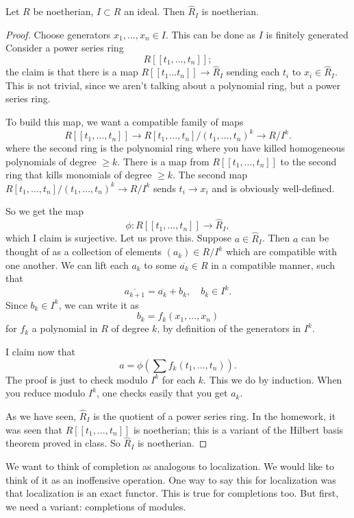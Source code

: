 \begin{proposition} 
Let $R$ be noetherian, $I \subset R$ an ideal. Then $\hat{R}_I$ is noetherian.
\end{proposition} 
\begin{proof} 
Choose generators $x_1, \dots, x_n \in I$. This can be done as $I$ is finitely generated
Consider a power series ring 
\[ R[[t_1, \dots, t_n]] ; \]
the claim is that there is a map $R[[t_1\dots t_n]] \to \hat{R}_I$ sending each
$t_i$ to $x_i  \in \hat{R}_I$. This is not trivial, since we aren't talking
about a polynomial ring, but a power series ring. 

To build this map, we  want a compatible family of maps
\[ R[[t_1, \dots, t_n]] \to R[t_1, \dots, t_n]/(t_1, \dots, t_n)^k  \to R/I^k.  \]
where the second ring is the polynomial ring where you have killed homogeneous
polynomials of degree $\geq k$. There is a map from $R[[t_1, \dots, t_n]]$ to
the second ring that kills monomials of degree $ \geq k$. The second map
$R[t_1, \dots, t_n]/(t_1, \dots, t_n)^k \to R/I^k$ sends $t_i \to x_i$ and is
obviously well-defined.

So we get the map
\[ \phi:  R[[t_1, \dots, t_n]] \to \hat{R}_I ,  \]
which I claim is surjective. Let us prove this. Suppose $a \in \hat{R}_I$. Then $a$ can be thought
of as a collection of elements $(a_k) \in R/I^k$ which are compatible with one
another.  We can lift each $a_k$ to some $\overline{a_k} \in R$ in a
compatible manner, such that
\[ \overline{a_{k+1}} = \overline{a_k} + b_k, \quad b_k \in I^k.  \]
Since $b_k \in I^k$, we can write it as
\[ b_k = f_k(x_1, \dots, x_n)  \]
for $f_k$ a polynomial in $R$ of degree $k$, by definition of the generators in
$I^k$. 

I claim now that 
\[ a = \phi\left( \sum f_k(t_1, \dots, t_n)  \right).  \]
The proof is just to check modulo $I^k$ for each $k$. This we  do by induction.
When you reduce  modulo $I^k$, one checks easily that you get $a_k$.

As we have seen, $\hat{R}_I$ is the quotient of a power series ring. In the
homework, it was seen that $R[[t_1, \dots, t_n]]$ is noetherian; this is a
variant of the Hilbert basis theorem proved in class. So $\hat{R}_I$ is
noetherian.
\end{proof} 

We want to think of completion as analogous to localization. We would like to
think of it as an inoffensive operation. One way to say this for localization
was that localization is an exact functor. This is true for completions too.
But first, we need a variant: completions of modules.

